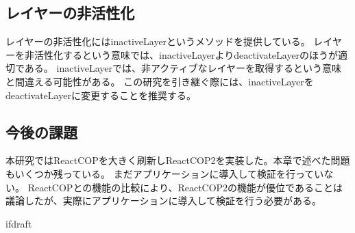 \documentclass{jsarticle}
\begin{document}
\subsection{レイヤーの非活性化}
レイヤーの非活性化にはinactiveLayerというメソッドを提供している。
レイヤーを非活性化するという意味では、inactiveLayerよりdeactivateLayerのほうが適切である。
inactiveLayerでは、非アクティブなレイヤーを取得するという意味と間違える可能性がある。
この研究を引き継ぐ際には、inactiveLayerをdeactivateLayerに変更することを推奨する。

\subsection{今後の課題}
本研究ではReactCOPを大きく刷新しReactCOP2を実装した。本章で述べた問題もいくつか残っている。
まだアプリケーションに導入して検証を行っていない。
ReactCOPとの機能の比較により、ReactCOP2の機能が優位であることは議論したが、実際にアプリケーションに導入して検証を行う必要がある。

\expandafter\ifx\csname ifdraft\endcsname\relax
\end{document}
